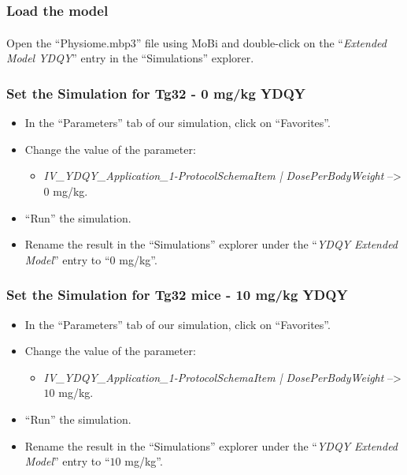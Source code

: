 \documentclass[fleqn,10pt]{physiome}
\begin{document}
\subsubsection{Load the model}
Open the ``Physiome.mbp3'' file using MoBi\textsuperscript{\textregistered} and double-click on the ``\textit{Extended Model YDQY}'' entry in the ``Simulations'' explorer.

\subsubsection{Set the Simulation for Tg32 - 0 mg/kg YDQY}
\begin{itemize}
    \item In the ``Parameters'' tab of our simulation, click on ``Favorites''.
    \item Change the value of the parameter: 
    \begin{itemize}
        \item \textit{IV\_YDQY\_Application\_1-ProtocolSchemaItem | DosePerBodyWeight} --> $0$ mg/kg.
    \end{itemize}
    \item ``Run'' the simulation.
    \item Rename the result in the ``Simulations'' explorer under the ``\textit{YDQY Extended Model}'' entry to ``$0$ mg/kg''.
\end{itemize}

\subsubsection{Set the Simulation for Tg32 mice - 10 mg/kg YDQY}
\begin{itemize}
    \item In the ``Parameters'' tab of our simulation, click on ``Favorites''.
    \item Change the value of the parameter: 
    \begin{itemize}
        \item \textit{IV\_YDQY\_Application\_1-ProtocolSchemaItem | DosePerBodyWeight} --> $10$ mg/kg.
    \end{itemize}
    \item ``Run'' the simulation.
    \item Rename the result in the ``Simulations'' explorer under the ``\textit{YDQY Extended Model}'' entry to ``$10$ mg/kg''.
\end{itemize}
\end{document}
